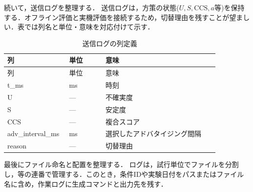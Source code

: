 続いて，送信ログを整理する．
送信ログは，方策の状態($U,S,\mathrm{CCS},a$等)を保持する．オフライン評価と実機評価を接続するため，切替理由を残すことが望ましい．表では列名と単位・意味を対応付けて示す．

\begin{longtable}{p{0.20\linewidth}p{0.16\linewidth}p{0.50\linewidth}}
  \caption{送信ログの列定義}\label{tab:tx_schema}\\
  \toprule
  列 & 単位 & 意味 \\
  \midrule
  \endfirsthead
  \toprule
  列 & 単位 & 意味 \\
  \midrule
  \endhead
  t\_ms & ms & 時刻 \\
  U & --- & 不確実度 \\
  S & --- & 安定度 \\
  CCS & --- & 複合スコア \\
  adv\_interval\_ms & ms & 選択したアドバタイジング間隔 \\
  reason & --- & 切替理由 \\
  \bottomrule
\end{longtable}

最後にファイル命名と配置を整理する．
ログは，試行単位でファイルを分割し，\texttt{}等の連番で管理する．このとき，条件IDや実験日付をパスまたはファイル名に含め，作業ログに生成コマンドと出力先を残す．




